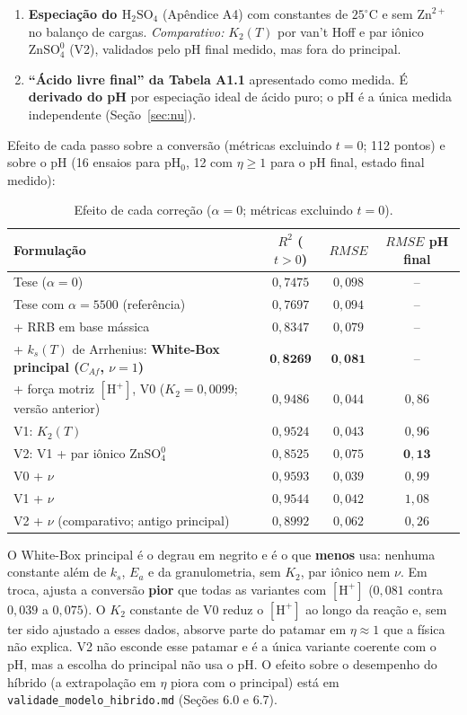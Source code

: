 \documentclass[12pt,a4paper]{article}
\begin{document}
\begin{enumerate}
    \item \textbf{Especiação do $\text{H}_2\text{SO}_4$} (Apêndice A4) com constantes de $25^\circ\text{C}$ e sem $\text{Zn}^{2+}$ no balanço de cargas. \textit{Comparativo:} $K_2(T)$ por van't Hoff e par iônico $\text{ZnSO}_4^0$ (V2), validados pelo pH final medido, mas fora do principal.
    \item \textbf{``Ácido livre final'' da Tabela A1.1} apresentado como medida. É \textbf{derivado do pH} por especiação ideal de ácido puro; o pH é a única medida independente (Seção~\ref{sec:nu}).
\end{enumerate}

Efeito de cada passo sobre a conversão (métricas excluindo $t = 0$; 112 pontos) e sobre o pH (16 ensaios para pH$_0$, 12 com $\eta \ge 1$ para o pH final, estado final medido):

\begin{table}[htbp]
\centering
\caption{Efeito de cada correção ($\alpha = 0$; métricas excluindo $t = 0$).}
\begin{tabular}{l c c c}
\toprule
\textbf{Formulação} & $R^2$ ($t > 0$) & $RMSE$ & $RMSE$ pH final \\
\midrule
Tese ($\alpha = 0$) & $0{,}7475$ & $0{,}098$ & -- \\
Tese com $\alpha = 5500$ (referência) & $0{,}7697$ & $0{,}094$ & -- \\
+ RRB em base mássica & $0{,}8347$ & $0{,}079$ & -- \\
+ $k_s(T)$ de Arrhenius: \textbf{White-Box principal ($C_{Af}$, $\nu = 1$)} & $\mathbf{0{,}8269}$ & $\mathbf{0{,}081}$ & -- \\
+ força motriz $[\text{H}^+]$, V0 ($K_2 = 0{,}0099$; versão anterior) & $0{,}9486$ & $0{,}044$ & $0{,}86$ \\
V1: $K_2(T)$ & $0{,}9524$ & $0{,}043$ & $0{,}96$ \\
V2: V1 + par iônico $\text{ZnSO}_4^0$ & $0{,}8525$ & $0{,}075$ & $\mathbf{0{,}13}$ \\
V0 + $\nu$ & $0{,}9593$ & $0{,}039$ & $0{,}99$ \\
V1 + $\nu$ & $0{,}9544$ & $0{,}042$ & $1{,}08$ \\
V2 + $\nu$ (comparativo; antigo principal) & $0{,}8992$ & $0{,}062$ & $0{,}26$ \\
\bottomrule
\end{tabular}
\end{table}

O White-Box principal é o degrau em negrito e é o que \textbf{menos} usa: nenhuma constante além de $k_s$, $E_a$ e da granulometria, sem $K_2$, par iônico nem $\nu$. Em troca, ajusta a conversão \textbf{pior} que todas as variantes com $[\text{H}^+]$ ($0{,}081$ contra $0{,}039$ a $0{,}075$). O $K_2$ constante de V0 reduz o $[\text{H}^+]$ ao longo da reação e, sem ter sido ajustado a esses dados, absorve parte do patamar em $\eta \approx 1$ que a física não explica. V2 não esconde esse patamar e é a única variante coerente com o pH, mas a escolha do principal não usa o pH. O efeito sobre o desempenho do híbrido (a extrapolação em $\eta$ piora com o principal) está em \texttt{validade\_modelo\_hibrido.md} (Seções 6.0 e 6.7).
\end{document}
